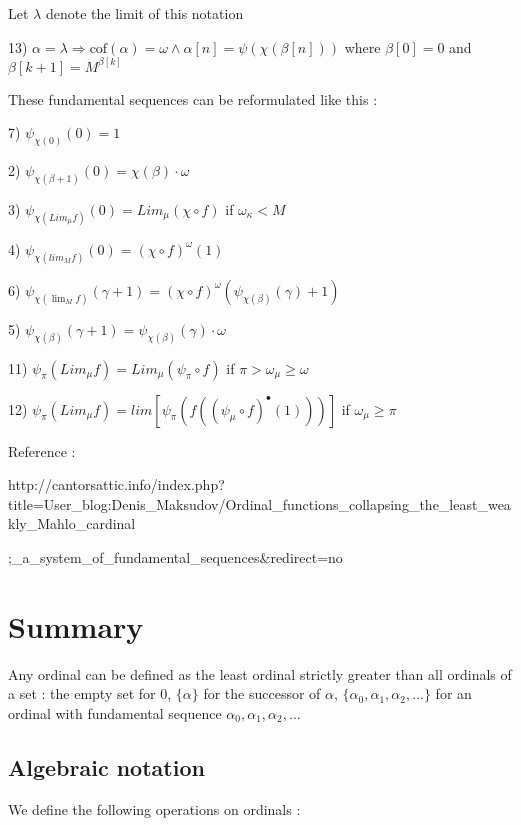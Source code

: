 \documentclass[10pt]{article}
\begin{document}
Let \(\lambda\) denote the limit of this notation

13) \(\alpha=\lambda\Rightarrow\text{cof} (\alpha)=\omega \wedge \alpha[n]=\psi(\chi(\beta[n]))\) where \(\beta[0]=0\) 
and \(\beta[k+1]=M^{\beta[k]}\)

\bigskip

These fundamental sequences can be reformulated like this :

7) \( \psi_{\chi(0)}(0) = 1 \)

2) \( \psi_{\chi(\beta+1)}(0) = \chi(\beta) \cdot \omega \)

3) \( \psi_{\chi(Lim_\mu f)}(0) = Lim_\mu(\chi \circ f) \) if \( \omega_\kappa < M \)

4) \( \psi_{\chi(lim_M f)}(0) = (\chi \circ f)^\omega (1) \)

6) \( \psi_{\chi(\lim_M f)}(\gamma+1) = (\chi \circ f)^\omega (\psi_{\chi(\beta)}(\gamma)+1) \)

5) \( \psi_{\chi(\beta)}(\gamma+1) = \psi_{\chi(\beta)}(\gamma) \cdot \omega \)

11) \( \psi_\pi (Lim_\mu f) = Lim_\mu (\psi_\pi \circ f) \) if \( \pi > \omega_\mu \ge \omega \)

12) \( \psi_\pi (Lim_\mu f) = lim [\psi_\pi(f((\psi_\mu \circ f)^\bullet(1)))] \) if \( \omega_\mu \ge \pi \)

\bigskip

Reference :

http://cantorsattic.info/index.php?title=User\_blog:Denis\_Maksudov/Ordinal\_functions\_collapsing\_the\_least\_weakly\_Mahlo\_cardinal

;\_a\_system\_of\_fundamental\_sequences\&redirect=no


\section{Summary}

Any ordinal can be defined as the least ordinal strictly greater than all ordinals of a set : the empty set for 0, \(\lbrace \alpha \rbrace\) for the successor of \( \alpha \),  \(\lbrace \alpha_0,\alpha_1,\alpha_2,...\rbrace\) for an ordinal with fundamental sequence \(\alpha_0, \alpha_1, \alpha_2, ...\)

\subsection{Algebraic notation}

We define the following operations on ordinals :
\end{document}
